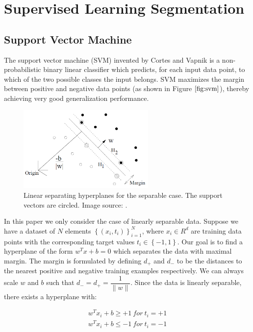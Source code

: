 \documentclass{SMBV12}
\begin{document}
\section{Supervised Learning Segmentation}

\subsection{Support Vector Machine}
\label{sec:svm}

The support vector machine (SVM) invented by Cortes and Vapnik \cite{cortes1995support} is a non-probabilistic binary linear classifier which predicts, for each input data point, to which of the two possible classes the input belongs. SVM maximizes the margin between positive and negative data points (as shown in Figure $\ref{fig:svm}$), thereby achieving very good generalization performance.

\begin{figure}[htbp]
    \centering
    \includegraphics[width=0.60\textwidth]{images/svm.png}
    \caption{Linear separating hyperplanes for the separable case. The support vectors are circled. Image source: \cite{burges1998tutorial}.}
    \label{fig:svm}
\end{figure}

In this paper we only consider the case of linearly separable data. Suppose we have a dataset of $N$ elements $\left\lbrace (x_i, t_i)\right\rbrace _{i=1}^N$, where $x_i \in R^d$ are training data points with the corresponding target values $t_i \in \left\lbrace -1, 1\right\rbrace $. Our goal is to find a hyperplane of the form $w^T x + b = 0$ which separates the data with maximal margin. The margin is formulated by defining $d_+$ and $d_-$ to be the distances to the nearest positive and negative training examples respectively. We can always scale $w$ and $b$ such that $d_- = d_+ = \dfrac{1}{\|w\|}$. Since the data is linearly separable, there exists a
hyperplane with:

\begin{equation}
	\begin{array}{lcl}
	w^T x_i + b \geq +1\ for\ t_i = +1\\
	w^T x_i + b \leq -1\ for\ t_i = -1
	\end{array}
\end{equation}
\end{document}
